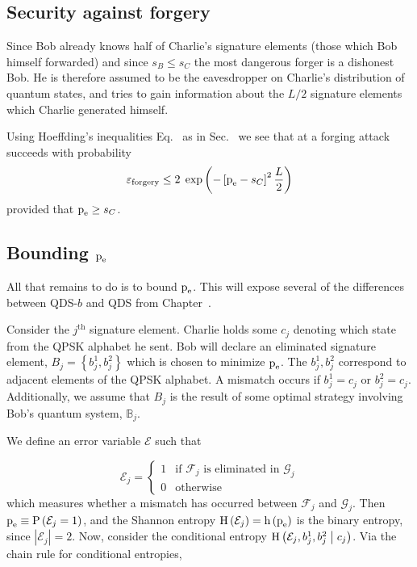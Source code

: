\subsection{Security against forgery}
Since Bob already knows half of Charlie's signature elements (those which Bob himself forwarded) and since $s_B \le s_C$ the most dangerous forger is a dishonest Bob. He is therefore assumed to be the eavesdropper on Charlie's distribution of quantum states, and tries to gain information about the $L/2$ signature elements which Charlie generated himself.

Using Hoeffding's inequalities Eq.~ as in Sec.~ we see that at a forging attack succeeds with probability 
\begin{equation}\label{eqn:aqc_forgery}
\varepsilon_{\text{forgery}} \le 2 \; \exp\left( - \left[ \text{p}_{\text{e}} - s_C\right]^2 \frac{L}{2} \right)
\end{equation}
provided that $\text{p}_{\text{e}} \ge s_C$. 

\subsection{Bounding $\text{p}_{\text{e}}$}
All that remains to do is to bound $\text{p}_{\text{e}}$. This will expose several of the differences between QDS-$b$ and QDS from Chapter~.


Consider the $j^\text{th}$ signature element. Charlie holds some $c_j$ denoting which state from the QPSK alphabet he sent. Bob will declare an eliminated signature element, $B_j = \left\{b_j^1, b_j^2\right\}$ which is chosen to minimize $\text{p}_{\text{e}}$. The $b_j^1, b_j^2$ correspond to adjacent elements of the QPSK alphabet. A mismatch occurs if $b_j^1 = c_j$ or $b_j^2 = c_j$. Additionally, we assume that $B_j$ is the result of some optimal strategy involving Bob's quantum system, $\mathbb{B}_j$.

We define an error variable $\mathcal{E}$ such that 

\begin{equation*}\label{eqn:aqc_error}
\mathcal{E}_j = 
\begin{cases}
1 & \text{if $\mathcal{F}_j$ is eliminated in $\mathcal{G}_j$} \\
0 & \text{otherwise}
\end{cases}
\end{equation*}
which measures whether a mismatch has occurred between $\mathcal{F}_j$ and $\mathcal{G}_j$. Then $\text{p}_{\text{e}} \equiv \text{P}\left(\mathcal{E}_j = 1\right)$, and the Shannon entropy $\text{H}\left(\mathcal{E}_j\right) = \text{h}\left(\text{p}_{\text{e}}\right)$ is the binary entropy, since $\left|\mathcal{E}_j\right| = 2$. Now, consider the conditional entropy $\text{H}\left(\mathcal{E}_j, b_j^1, b_j^2 \; \middle| \; c_j\right)$. Via the chain rule for conditional entropies,

